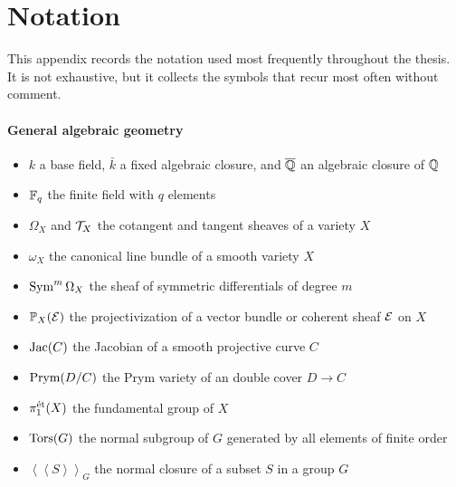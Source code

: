 \documentclass[main.tex]{subfiles}
\begin{document}
\chapter{Notation} \label{appendix:notation}

This appendix records the notation used most frequently throughout the thesis. It is not exhaustive, but it collects the symbols that recur most often without comment.

\subsubsection*{General algebraic geometry}
\begin{itemize}
\item $k$ a base field, $\bar{k}$ a fixed algebraic closure, and $\overline{\mathbb{Q}}$ an algebraic closure of $\mathbb{Q}$
\item $\mathbb{F}_q$ the finite field with $q$ elements
\item $\Omega_X$ and $\mathcal{T}_X$ the cotangent and tangent sheaves of a variety $X$
\item $\omega_X$ the canonical line bundle of a smooth variety $X$
\item $\operatorname{\mathrm{Sym}}^m \Omega_X$ the sheaf of symmetric differentials of degree $m$
\item $\mathbb{P}_X(\mathcal{E})$ the projectivization of a vector bundle or coherent sheaf $\mathcal{E}$ on $X$
\item $\operatorname{\mathrm{Jac}}(C)$ the Jacobian of a smooth projective curve $C$
\item $\operatorname{\mathrm{Prym}}(D/C)$ the Prym variety of an \etale double cover $D \to C$
\item $\pi_1^{\mathrm{\acute{e}t}}(X)$ the \etale fundamental group of $X$
\item $\operatorname{\mathrm{Tors}}(G)$ the normal subgroup of $G$ generated by all elements of finite order
\item $\left<\left< S \right>\right>_G$ the normal closure of a subset $S$ in a group $G$
\end{itemize}
\end{document}
